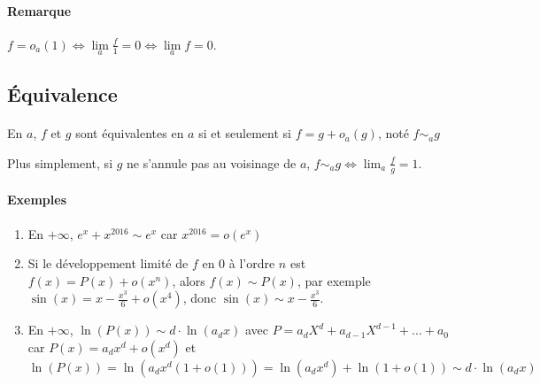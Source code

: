 \documentclass[]{article}
\begin{document}
\paragraph{Remarque}
$f=o_a(1) \Longleftrightarrow \lim\limits_{a} \frac{f}{1} = 0 \Longleftrightarrow \lim\limits_{a} f = 0$.

\subsection{Équivalence}

\paragraph[Définition]{}
En $a$, $f$ et $g$ sont équivalentes en $a$ si et seulement si $f=g+o_a(g)$, noté $f \sim_a g$

Plus simplement, si $g$ ne s'annule pas au voisinage de $a$, $\displaystyle f \sim_a g \Leftrightarrow \lim_a \frac{f}{g}=1$.

\paragraph{Exemples}
\begin{enumerate}
	\item En $+ \infty$, $e^x + x^{2016} \sim e^x$ car $x^{2016}=o(e^x)$
	
	\item Si le développement limité de $f$ en $0$ à l'ordre $n$ est $f(x)=P(x)+o(x^n)$, alors $f(x) \sim P(x)$, par exemple $\sin(x)=x-\frac{x^3}{6}+o(x^4)$, donc $\sin(x) \sim x-\frac{x^3}{6}$.
	
	\item En $+\infty$, $\ln(P(x)) \sim d \cdot \ln(a_dx)$ avec $P = a_d X^d + a_{d-1}X^{d-1} + ... + a_0$ car $P(x) = a_d x^d + o(x^d)$ et $\ln(P(x))=\ln(a_d x^d(1+o(1)))=\ln(a_dx^d)+\ln(1+o(1)) \sim d \cdot \ln(a_d x)$
\end{enumerate}
\end{document}
